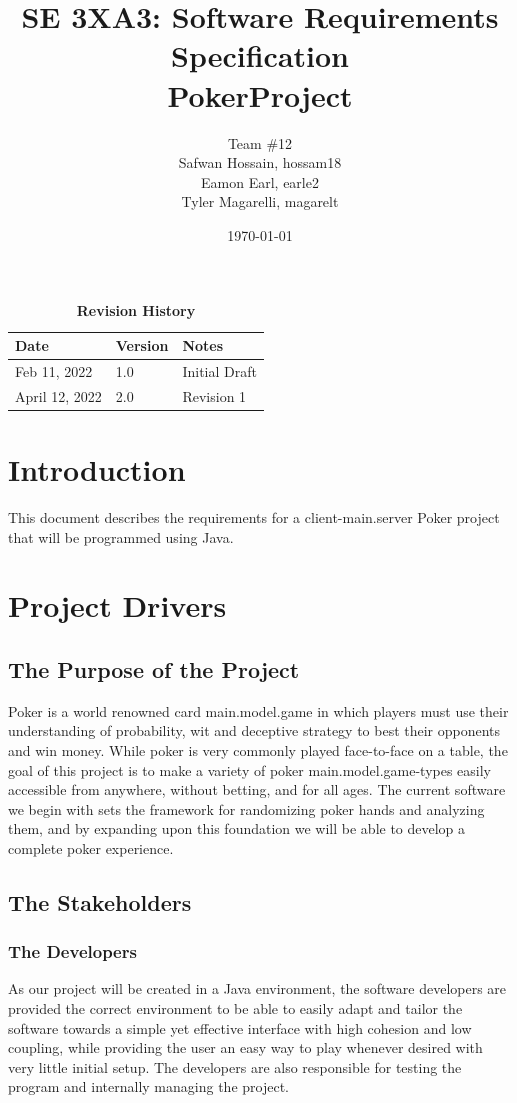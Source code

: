 \documentclass[12pt, titlepage]{article}
\title{SE 3XA3: Software Requirements Specification\\PokerProject}
\author{Team \#12
        \\ Safwan Hossain, hossam18
        \\ Eamon Earl, earle2
        \\ Tyler Magarelli, magarelt
}
\date{\today}
\begin{document}
\maketitle

\tableofcontents
\listoftables
\listoffigures

\begin{table}[bp]
\caption{\bf Revision History}
\begin{tabularx}{\textwidth}{p{3cm}p{2cm}X}
\toprule {\bf Date} & {\bf Version} & {\bf Notes}\\
\midrule
Feb 11, 2022 & 1.0 & Initial Draft\\
April 12, 2022 & 2.0 & Revision 1\\
\bottomrule
\end{tabularx}
\end{table}

\newpage


\section{Introduction}
This document describes the requirements for a client-main.server Poker project that will be programmed using Java.

\section{Project Drivers}

\subsection{The Purpose of the Project}
Poker is a world renowned card main.model.game in which players must use their understanding of probability,
wit and deceptive strategy to best their opponents and win money. While poker is very commonly
played face-to-face on a table, the goal of this project is to make a variety of poker main.model.game-types easily
accessible from anywhere, without betting, and for all ages. The current software we begin with sets the framework for randomizing
poker hands and analyzing them, and by expanding upon this foundation we will be able to develop a complete poker
experience.
\subsection{The Stakeholders}

\subsubsection{The Developers}
As our project will be created in a Java environment, the software developers are provided the correct environment to be able to easily adapt and tailor the software towards a simple yet effective interface with high cohesion and low coupling,
while providing the user an easy way to play whenever desired with very little initial setup. The developers are also responsible for testing the program and internally managing the project.
\end{document}

